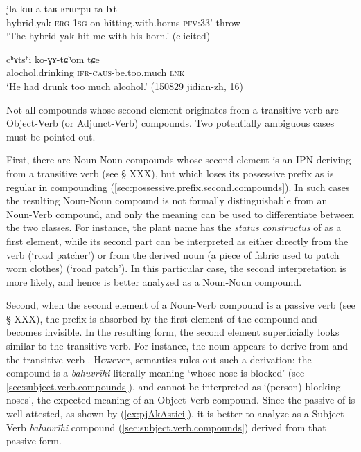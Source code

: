 \begin{exe}
\ex \label{ex:RrWrpu}
 \gll jla kɯ a-taʁ ʁrɯrpu ta-lɤt \\
 hybrid.yak \textsc{erg} \textsc{1sg}-on hitting.with.horns \textsc{pfv}:3\fl{}3'-throw \\
 \glt `The hybrid yak hit me with his horn.' (elicited)
\end{exe}

\begin{exe}
\ex \label{ex:chAtshi.koGAtChom}
 \gll cʰɤtsʰi ko-ɣɤ-tɕʰom tɕe  \\
 alochol.drinking \textsc{ifr}-\textsc{caus}-be.too.much \textsc{lnk} \\
\glt `He had drunk too much alcohol.' (150829 jidian-zh, 16)
\end{exe}
Not all compounds whose second element originates from a transitive verb are Object-Verb (or Adjunct-Verb) compounds. Two potentially ambiguous cases must be pointed out. 

First, there are Noun-Noun compounds whose second element is an IPN deriving from a transitive verb (see § XXX), but which loses its possessive prefix as is regular in compounding (\ref{sec:possessive.prefix.second.compounds}). In such cases the resulting Noun-Noun compound is not formally distinguishable from an Noun-Verb compound, and only the meaning can be used to differentiate between the two classes. For instance, the plant name  has the \textit{status constructus} of  as a first element, while its second part  can be interpreted as either directly from the verb  (`road patcher') or from the derived noun  (a piece of fabric used to patch worn clothes) (`road patch'). In this particular case, the second interpretation is more likely, and hence  is better analyzed as a Noun-Noun compound.

Second, when the second element of a Noun-Verb compound is a  passive verb (see § XXX), the  prefix is absorbed by the first element of the compound and becomes invisible. In the resulting form, the second element superficially looks similar to the transitive verb. For instance, the noun  appears to derive from  and the transitive verb  . However, semantics rules out such a derivation: the compound is a \textit{bahuvrīhi} literally meaning `whose nose is blocked' (see \ref{sec:subject.verb.compounds}), and cannot be interpreted as `(person) blocking noses', the expected meaning of an Object-Verb compound. Since the passive  of   is well-attested, as shown by (\ref{ex:pjAkAstici}), it is better to analyze  as a Subject-Verb \textit{bahuvrīhi} compound (\ref{sec:subject.verb.compounds}) derived from that passive form.

